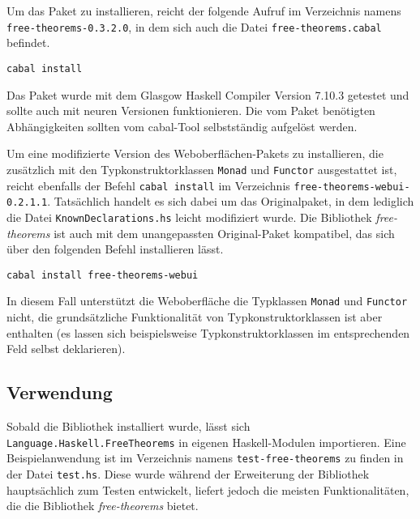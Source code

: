 Um das Paket zu installieren, reicht der folgende Aufruf im Verzeichnis namens \texttt{free-theorems-0.3.2.0}, in dem sich
auch die Datei \texttt{free-theorems.cabal} befindet.

\begin{verbatim}
cabal install
\end{verbatim}

Das Paket wurde mit dem Glasgow Haskell Compiler Version 7.10.3 getestet und sollte auch mit neuren Versionen
funktionieren. Die vom Paket benötigten Abhängigkeiten sollten vom cabal-Tool selbstständig aufgelöst werden.

Um eine modifizierte Version des Weboberflächen-Pakets zu installieren, die zusätzlich mit den Typkonstruktorklassen
\texttt{Monad} und \texttt{Functor} ausgestattet ist, reicht ebenfalls der Befehl \texttt{cabal install} im Verzeichnis
\texttt{free-theorems-webui-0.2.1.1}. Tatsächlich handelt es sich dabei um das Originalpaket, in dem lediglich die
Datei \texttt{KnownDeclarations.hs} leicht modifiziert wurde. Die Bibliothek \textit{free-theorems} ist auch mit dem
unangepassten Original-Paket kompatibel, das sich über den folgenden Befehl installieren lässt.

\begin{verbatim}
cabal install free-theorems-webui
\end{verbatim}

In diesem Fall unterstützt die Weboberfläche die Typklassen \texttt{Monad} und \texttt{Functor} nicht,
die grundsätzliche Funktionalität von Typkonstruktorklassen ist aber enthalten (es lassen sich beispielsweise
Typkonstruktorklassen im entsprechenden Feld selbst deklarieren).


\subsection*{Verwendung}

Sobald die Bibliothek installiert wurde, lässt sich \texttt{Language.Haskell.FreeTheorems} in eigenen
Haskell-Modulen importieren. Eine Beispielanwendung ist im Verzeichnis namens \texttt{test-free-theorems} zu finden in der
Datei \texttt{test.hs}. Diese wurde während der Erweiterung der Bibliothek hauptsächlich zum Testen entwickelt,
liefert jedoch die meisten Funktionalitäten, die die Bibliothek \textit{free-theorems} bietet.

